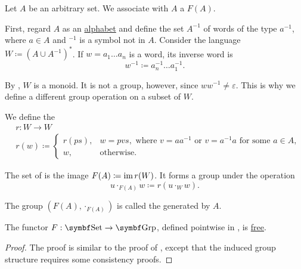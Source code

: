 \begin{definition}\label{def:free_group}\cite[306]{Knapp2016BAlg}
  Let \( A \) be an arbitrary set. We associate with \( A \) a  \( F(A) \). 

  First, regard \( A \) as an \hyperref[def:language]{alphabet} and define the set \( A^{-1} \) of words of the type \( a^{-1} \), where \( a \in A \) and \( \mbox{}^{-1} \) is a symbol not in \( A \). Consider the language \( W \coloneqq (A \cup A^{-1})^{*} \). If \( w = a_1 \ldots a_n \) is a word, its inverse word is
  \begin{equation*}
    w^{-1} \coloneqq a_n^{-1} \ldots a_1^{-1}.
  \end{equation*}

  By , \( W \) is a monoid. It is not a group, however, since \( w w^{-1} \neq \varepsilon \). This is why we define a different group operation on a subset of \( W \).

  We define the 
  \begin{align*}
    &r: W \to W \\
    &r(w) \coloneqq \begin{cases}
      r(ps), &w = pvs, \text{ where } v = aa^{-1} \text{ or } v = a^{-1}a \text{ for some } a \in A, \\
      w, &\text{otherwise}.
    \end{cases}
  \end{align*}

  The set of  is the image \( F(A) \coloneqq \operatorname{im} r(W) \). It forms a group under the operation
  \begin{equation*}
    u \cdot_{F(A)} w \coloneqq r(u \cdot_{W} w).
  \end{equation*}

  The group \( (F(A), \cdot_{F(A)}) \) is called the  generated by \( A \).
\end{definition}

\begin{proposition}\label{thm:free_group_is_free_functor}
  The functor \( F: \Cat{Set} \to \Cat{Grp} \), defined pointwise in , is \hyperref[def:free_functor]{free}.
\end{proposition}
\begin{proof}
  The proof is similar to the proof of , except that the induced group structure requires some consistency proofs.
\end{proof}


